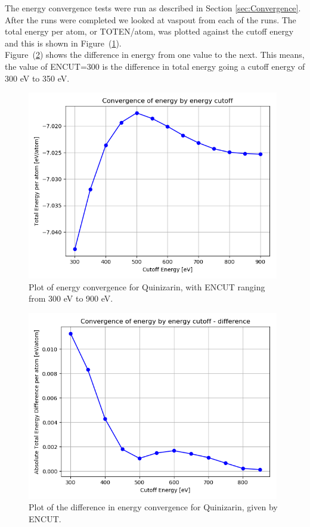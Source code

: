 \documentclass{article}
\begin{document}
     The energy convergence tests were run as described in Section \ref{sec:Convergence}. After the runs were completed we looked at vaspout from each of the runs. The total energy per atom, or TOTEN/atom, was plotted against the cutoff energy and this is shown in Figure~(\ref{fig:convergence_energy}). \\

     Figure~(\ref{fig:convergence_energy_difference}) shows the difference in energy from one value to the next. This means, the value of ENCUT=300 is the difference in total energy going a cutoff energy of 300 eV to 350 eV. \\

    \begin{figure}[H]
      \centering
      \includegraphics[width = 11cm]{../fig/convergence_energy.png}
      \caption{Plot of energy convergence for Quinizarin, with ENCUT ranging from 300 eV to 900 eV. }
      \label{fig:convergence_energy}
    \end{figure}

    \begin{figure}[H]
      \centering
      \includegraphics[width = 11cm]{../fig/convergence_energy_difference.png}
      \caption{Plot of the difference in energy convergence for Quinizarin, given by ENCUT. }
      \label{fig:convergence_energy_difference}
    \end{figure}
\end{document}
